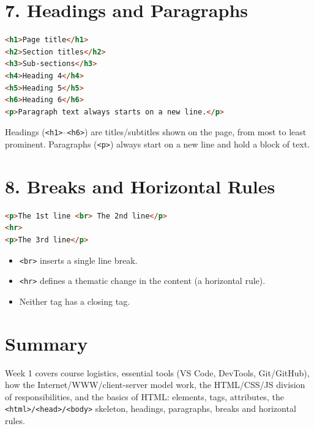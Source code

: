 \documentclass[12pt]{article}
\begin{document}
\section{7. Headings and Paragraphs}
\begin{lstlisting}[language=HTML]
<h1>Page title</h1>
<h2>Section titles</h2>
<h3>Sub-sections</h3>
<h4>Heading 4</h4>
<h5>Heading 5</h5>
<h6>Heading 6</h6>
<p>Paragraph text always starts on a new line.</p>
\end{lstlisting}
Headings (\texttt{<h1>}–\texttt{<h6>}) are titles/subtitles shown on the page, from most to least prominent. Paragraphs (\texttt{<p>}) always start on a new line and hold a block of text.

\section{8. Breaks and Horizontal Rules}
\begin{lstlisting}[language=HTML]
<p>The 1st line <br> The 2nd line</p>
<hr>
<p>The 3rd line</p>
\end{lstlisting}
\begin{itemize}
    \item \texttt{<br>} inserts a single line break.
    \item \texttt{<hr>} defines a thematic change in the content (a horizontal rule).
    \item Neither tag has a closing tag.
\end{itemize}

\section{Summary}
Week 1 covers course logistics, essential tools (VS Code, DevTools, Git/GitHub), how the Internet/WWW/client-server model work, the HTML/CSS/JS division of responsibilities, and the basics of HTML: elements, tags, attributes, the \texttt{<html>/<head>/<body>} skeleton, headings, paragraphs, breaks and horizontal rules.
\end{document}
